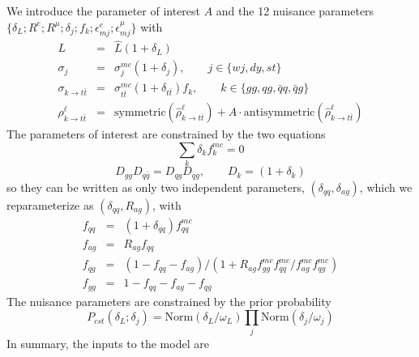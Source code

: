 \documentclass{article}
\begin{document}
We introduce the parameter of interest $A$ and the 12 nuisance
parameters
$\{\delta_L;R^e;R^\mu;\delta_j;f_k;\epsilon_{mj}^e;\epsilon_{mj}^\mu\}$
with
\begin{eqnarray}
  L &=& \hat{L}(1+\delta_L) \\
  \sigma_j &=& \sigma_j^{mc}(1+\delta_j),\qquad j\in \{wj,dy,st\}\\
  \sigma_{k\to t\bar{t}} &=& \sigma_{t\bar{t}}^{mc}(1+\delta_{t\bar{t}}) f_k, \qquad k\in \{gg,qg,\bar{q}q,\bar{q}g\}\\
  \rho^\ell_{k\to t\bar{t}} &=& \mathrm{symmetric}(\hat{\rho}^\ell_{k\to t\bar{t}}) + A\cdot\mathrm{antisymmetric}(\hat{\rho}^\ell_{k\to t\bar{t}})
\end{eqnarray}
The parameters of interest are constrained by the two equations
\begin{equation}
  \sum_k \delta_kf_k^{mc} = 0
\end{equation}
\begin{equation}
  D_{gg}D_{q\bar{q}} = D_{qg}D_{\bar{q}g}, \qquad D_k = (1+\delta_k)
\end{equation}
so they can be written as only two independent parameters,
$(\delta_{qq},\delta_{ag})$, which we reparameterize as
$(\delta_{qq},R_{ag})$, with
\begin{eqnarray}
  f_{qq} &=& (1+\delta_{qq})f_{qq}^{mc}\\
  f_{ag} &=& R_{ag}f_{qq}\\
  f_{qg} &=& (1-f_{qq}-f_{ag})/(1+R_{ag}f_{gg}^{mc}f_{qq}^{mc}/f_{ag}^{mc}f_{qg}^{mc})\\
  f_{gg} &=& 1 - f_{qq} - f_{ag} - f_{qg}
\end{eqnarray}
The nuisance parameters are constrained by the prior probability
\begin{equation}
  P_{cst}(\delta_L;\delta_j) = \mathrm{Norm}(\delta_L/\omega_L)\prod_j\mathrm{Norm}(\delta_j/\omega_j)
\end{equation}
In summary, the inputs to the model are
\end{document}
